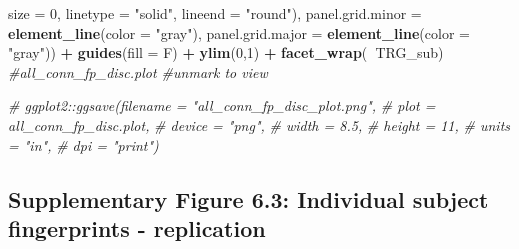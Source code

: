 \documentclass[
]{article}
\newenvironment{Shaded}{\begin{snugshade}}{\end{snugshade}}
\newcommand{\CommentTok}[1]{\textcolor[rgb]{0.56,0.35,0.01}{\textit{#1}}}
\newcommand{\DataTypeTok}[1]{\textcolor[rgb]{0.13,0.29,0.53}{#1}}
\newcommand{\DecValTok}[1]{\textcolor[rgb]{0.00,0.00,0.81}{#1}}
\newcommand{\KeywordTok}[1]{\textcolor[rgb]{0.13,0.29,0.53}{\textbf{#1}}}
\newcommand{\NormalTok}[1]{#1}
\newcommand{\OperatorTok}[1]{\textcolor[rgb]{0.81,0.36,0.00}{\textbf{#1}}}
\newcommand{\StringTok}[1]{\textcolor[rgb]{0.31,0.60,0.02}{#1}}
\begin{document}
\begin{Shaded}
\begin{Highlighting}[]
                                 \DataTypeTok{size =} \DecValTok{0}\NormalTok{, }\DataTypeTok{linetype =} \StringTok{"solid"}\NormalTok{, }\DataTypeTok{lineend =} \StringTok{"round"}\NormalTok{),}
        \DataTypeTok{panel.grid.minor =} \KeywordTok{element_line}\NormalTok{(}\DataTypeTok{color =} \StringTok{"gray"}\NormalTok{), }
        \DataTypeTok{panel.grid.major =} \KeywordTok{element_line}\NormalTok{(}\DataTypeTok{color =} \StringTok{"gray"}\NormalTok{)) }\OperatorTok{+}\StringTok{ }
\StringTok{  }\KeywordTok{guides}\NormalTok{(}\DataTypeTok{fill =}\NormalTok{ F) }\OperatorTok{+}\StringTok{ }
\StringTok{  }\KeywordTok{ylim}\NormalTok{(}\DecValTok{0}\NormalTok{,}\DecValTok{1}\NormalTok{) }\OperatorTok{+}\StringTok{ }
\StringTok{  }\KeywordTok{facet_wrap}\NormalTok{(}\OperatorTok{~}\NormalTok{TRG_sub)}
\CommentTok{#all_conn_fp_disc.plot #unmark to view}

\CommentTok{# ggplot2::ggsave(filename = "all_conn_fp_disc_plot.png",}
\CommentTok{#                 plot = all_conn_fp_disc.plot,}
\CommentTok{#                 device = "png",}
\CommentTok{#                 width = 8.5,}
\CommentTok{#                 height = 11, }
\CommentTok{#                 units = "in",}
\CommentTok{#                 dpi = "print")}
\end{Highlighting}
\end{Shaded}

\hypertarget{supplementary-figure-6.3-individual-subject-fingerprints---replication}{%
\subsection{Supplementary Figure 6.3: Individual subject fingerprints -
replication}\label{supplementary-figure-6.3-individual-subject-fingerprints---replication}}
\end{document}
